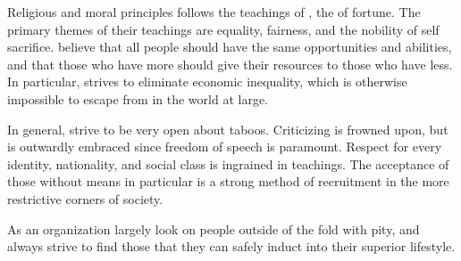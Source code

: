 \documentclass[blue]{GL2020}
\begin{document}
\name{\bCult{}}






Religious and moral principles
\pCult{} follows the teachings of \cCultGod{}, the \cCultGod{\god} of fortune. The primary themes of their teachings are equality, fairness, and the nobility of self sacrifice. \pCult{} believe that all people should have the same opportunities and abilities, and that those who have more should give their resources to those who have less. In particular, \pCult{} strives to eliminate economic inequality, which is otherwise impossible to escape from in the world at large.

In general, \pCult{} strive to be very open about taboos. Criticizing \pCult{} is frowned upon, but is outwardly embraced since freedom of speech is paramount. Respect for every identity, nationality, and social class is ingrained in \pCult{} teachings. The acceptance of those without means in particular is a strong method of recruitment in the more restrictive corners of society.

As an organization \pCult{} largely look on people outside of the fold with pity, and always strive to find those that they can safely induct into their superior lifestyle.

\end{document}
